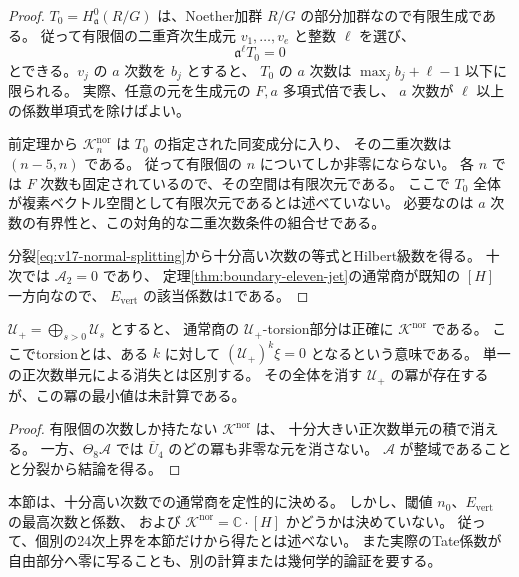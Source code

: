 \begin{proof}
$T_0=H^0_{\mathfrak a}(R/G)$ は、Noether加群 $R/G$ の部分加群なので有限生成である。
従って有限個の二重斉次生成元 $v_1,\ldots,v_e$ と整数 $\ell$ を選び、
\[
 \mathfrak a^\ell T_0=0
\]
とできる。$v_j$ の $a$ 次数を $b_j$ とすると、
$T_0$ の $a$ 次数は $\max_j b_j+\ell-1$ 以下に限られる。
実際、任意の元を生成元の $F,a$ 多項式倍で表し、
$a$ 次数が $\ell$ 以上の係数単項式を除けばよい。

前定理から $\mathcal K_n^{\mathrm{nor}}$ は $T_0$ の指定された同変成分に入り、
その二重次数は $(n-5,n)$ である。
従って有限個の $n$ についてしか非零にならない。
各 $n$ では $F$ 次数も固定されているので、その空間は有限次元である。
ここで $T_0$ 全体が複素ベクトル空間として有限次元であるとは述べていない。
必要なのは $a$ 次数の有界性と、この対角的な二重次数条件の組合せである。

分裂\eqref{eq:v17-normal-splitting}から十分高い次数の等式とHilbert級数を得る。
十次では $\mathcal A_2=0$ であり、
定理\ref{thm:boundary-eleven-jet}の通常商が既知の $[H]$ 一方向なので、
$E_{\mathrm{vert}}$ の該当係数は1である。
\end{proof}

\begin{corollary}[未知部分は正次数単元についての有限torsion]
\label{cor:v17-positive-unit-torsion}
$\mathcal U_+=\bigoplus_{s>0}\mathcal U_s$ とすると、
通常商の $\mathcal U_+$-torsion部分は正確に $\mathcal K^{\mathrm{nor}}$ である。
ここでtorsionとは、ある $k$ に対して $(\mathcal U_+)^k\xi=0$ となるという意味である。
単一の正次数単元による消失とは区別する。
その全体を消す $\mathcal U_+$ の冪が存在するが、この冪の最小値は未計算である。
\end{corollary}

\begin{proof}
有限個の次数しか持たない $\mathcal K^{\mathrm{nor}}$ は、
十分大きい正次数単元の積で消える。
一方、$\Theta_8\mathcal A$ では $\overline U_4$ のどの冪も非零な元を消さない。
$\mathcal A$ が整域であることと分裂から結論を得る。
\end{proof}

\begin{remark}[有効な有限計算の範囲はまだ別に必要である]
本節は、十分高い次数での通常商を定性的に決める。
しかし、閾値 $n_0$、$E_{\mathrm{vert}}$ の最高次数と係数、
および $\mathcal K^{\mathrm{nor}}=\mathbb C\cdot[H]$ かどうかは決めていない。
従って、個別の24次上界を本節だけから得たとは述べない。
また実際のTate係数が自由部分へ零に写ることも、別の計算または幾何学的論証を要する。
\end{remark}

